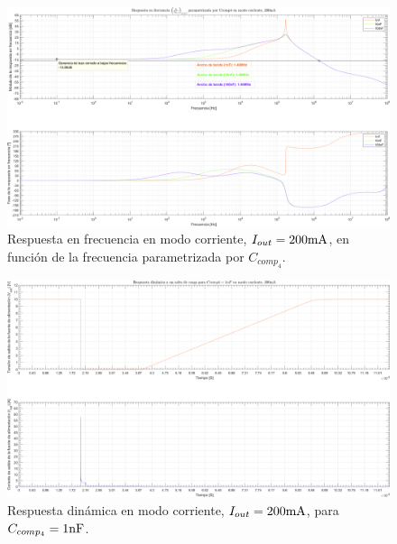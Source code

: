 \clearpage

\begin{figure}[H] %
\begin{center}
\includegraphics[width=1.1 \textwidth, angle=90]{./img/plots/rf/power_supply_CCOMP4_RF_Modo4.png}
\caption{\label{fig:fig_power_supply_CCOMP4_RF_Modo4}\footnotesize{Respuesta en frecuencia en modo corriente, $I_{out} = 200 \si[per-mode=symbol]{\milli\ampere}$, en función de la frecuencia parametrizada por $C_{comp_{4}}$.}}
\end{center}
\end{figure}

\clearpage

\begin{figure}[H] %
\begin{center}
\includegraphics[width=1.1 \textwidth, angle=90]{./img/plots/dynamic/power_supply_CCOMP4_1n_STEP_Modo4.png}
\caption{\label{fig:fig_power_supply_CCOMP4_STEP_1n_Modo4}\footnotesize{Respuesta dinámica en modo corriente, $I_{out} = 200 \si[per-mode=symbol]{\milli\ampere}$, para $C_{comp_{4}} = 1 \si[per-mode=symbol]{\nano\farad} $.}}
\end{center}
\end{figure}

